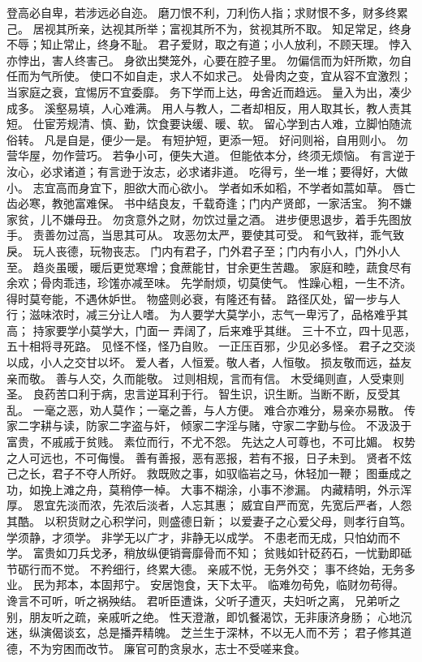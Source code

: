 \documentclass[12pt,UTF8]{ctexbook}
\begin{document}
登高必自卑，若涉远必自迩。
磨刀恨不利，刀利伤人指；求财恨不多，财多终累己。
居视其所亲，达视其所举；富视其所不为，贫视其所不取。
知足常足，终身不辱；知止常止，终身不耻。
君子爱财，取之有道；小人放利，不顾天理。
悖入亦悖出，害人终害己。
身欲出樊笼外，心要在腔子里。
勿偏信而为奸所欺，勿自任而为气所使。
使口不如自走，求人不如求己。
处骨肉之变，宜从容不宜激烈；当家庭之衰，宜惕厉不宜委靡。
务下学而上达，毋舍近而趋远。
量入为出，凑少成多。
溪壑易填，人心难满。
用人与教人，二者却相反，用人取其长，教人责其短。
仕宦芳规清、慎、勤，饮食要诀缓、暖、软。
留心学到古人难，立脚怕随流俗转。
凡是自是，便少一是。
有短护短，更添一短。
好问则裕，自用则小。
勿营华屋，勿作营巧。
若争小可，便失大道。
但能依本分，终须无烦恼。
有言逆于汝心，必求诸道；有言逊于汝志，必求诸非道。
吃得亏，坐一堆；要得好，大做小。
志宜高而身宜下，胆欲大而心欲小。
学者如禾如稻，不学者如蒿如草。
唇亡齿必寒，教弛富难保。
书中结良友，千载奇逢；门内产贤郎，一家活宝。
狗不嫌家贫，儿不嫌母丑。
勿贪意外之财，勿饮过量之酒。
进步便思退步，着手先图放手。
责善勿过高，当思其可从。
攻恶勿太严，要使其可受。
和气致祥，乖气致戾。
玩人丧德，玩物丧志。
门内有君子，门外君子至；门内有小人，门外小人至。
趋炎虽暖，暖后更觉寒增；食蔗能甘，甘余更生苦趣。
家庭和睦，蔬食尽有余欢；骨肉乖违，珍馐亦减至味。
先学耐烦，切莫使气。
性躁心粗，一生不济。
得时莫夸能，不遇休妒世。
物盛则必衰，有隆还有替。
路径仄处，留一步与人行；滋味浓时，减三分让人嗜。
为人要学大莫学小，志气一卑污了，品格难乎其高；
持家要学小莫学大，门面一 弄阔了，后来难乎其继。
三十不立，四十见恶，五十相将寻死路。
见怪不怪，怪乃自败。
一正压百邪，少见必多怪。
君子之交淡以成，小人之交甘以坏。
爱人者，人恒爱。敬人者，人恒敬。
损友敬而远，益友亲而敬。
善与人交，久而能敬。
过则相规，言而有信。
木受绳则直，人受柬则圣。
良药苦口利于病，忠言逆耳利于行。
智生识，识生断。当断不断，反受其乱。
一毫之恶，劝人莫作；一毫之善，与人方便。
难合亦难分，易亲亦易散。
传家二字耕与读，防家二字盗与奸，
倾家二字淫与赌，守家二字勤与俭。
不汲汲于富贵，不戚戚于贫贱。
素位而行，不尤不怨。
先达之人可尊也，不可比媚。
权势之人可远也，不可侮慢。
善有善报，恶有恶报，若有不报，日子未到。
贤者不炫己之长，君子不夺人所好。
救既败之事，如驭临岩之马，休轻加一鞭；
图垂成之功，如挽上滩之舟，莫稍停一棹。
大事不糊涂，小事不渗漏。
内藏精明，外示浑厚。
恩宜先淡而浓，先浓后淡者，人忘其惠；
威宜自严而宽，先宽后严者，人怨其酷。
以积货财之心积学问，则盛德日新；
以爱妻子之心爱父母，则孝行自笃。
学须静，才须学。
非学无以广才，非静无以成学。
不患老而无成，只怕幼而不学。
富贵如刀兵戈矛，稍放纵便销膏靡骨而不知；
贫贱如针砭药石，一忧勤即砥节砺行而不觉。
不矜细行，终累大德。
亲戚不悦，无务外交；
事不终始，无务多业。
民为邦本，本固邦宁。
安居饱食，天下太平。
临难勿苟免，临财勿苟得。
谗言不可听，听之祸殃结。
君听臣遭诛，父听子遭灭，夫妇听之离，
兄弟听之别，朋友听之疏，亲戚听之绝。
性天澄澈，即饥餐渴饮，无非康济身肠；
心地沉迷，纵演偈谈玄，总是播弄精魄。
芝兰生于深林，不以无人而不芳；
君子修其道德，不为穷困而改节。
廉官可酌贪泉水，志士不受嗟来食。

\backmatter
\end{document}
